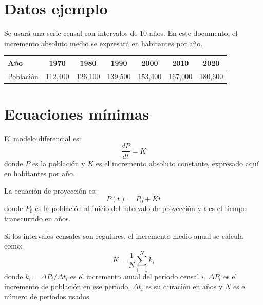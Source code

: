 \documentclass[12pt]{article}
\begin{document}

\section{Datos ejemplo}
Se usará una serie censal con intervalos de $10$ años. En este documento, el incremento absoluto medio se expresará en habitantes por año.

\begin{center}
\begin{tabular}{lcccccc}
\toprule
Año & 1970 & 1980 & 1990 & 2000 & 2010 & 2020 \\
\midrule
Población & 112,400 & 126,100 & 139,500 & 153,400 & 167,000 & 180,600 \\
\bottomrule
\end{tabular}
\end{center}

\section{Ecuaciones mínimas}
El modelo diferencial es:
\begin{equation}
\frac{dP}{dt}=K
\end{equation}
donde $P$ es la población y $K$ es el incremento absoluto constante, expresado aquí en habitantes por año.

La ecuación de proyección es:
\begin{equation}
P(t)=P_0+Kt
\end{equation}
donde $P_0$ es la población al inicio del intervalo de proyección y $t$ es el tiempo transcurrido en años.

Si los intervalos censales son regulares, el incremento medio anual se calcula como:
\begin{equation}
K=\frac{1}{N}\sum_{i=1}^{N} k_i
\end{equation}
donde $k_i=\Delta P_i/\Delta t_i$ es el incremento anual del período censal $i$, $\Delta P_i$ es el incremento de población en ese período, $\Delta t_i$ es su duración en años y $N$ es el número de períodos usados.

\end{document}
